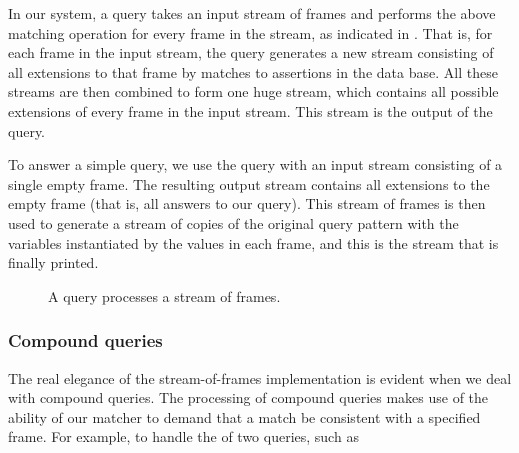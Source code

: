 In our system, a query takes an input stream of frames and performs the above
matching operation for every frame in the stream, as indicated in .
That is, for each frame in the input stream, the query generates a new
stream consisting of all extensions to that frame by matches to assertions in
the data base.  All these streams are then combined to form one huge stream,
which contains all possible extensions of every frame in the input stream.
This stream is the output of the query.

To answer a simple query, we use the query with an input stream consisting of a
single empty frame.  The resulting output stream contains all extensions to the
empty frame (that is, all answers to our query).  This stream of frames is then
used to generate a stream of copies of the original query pattern with the
variables instantiated by the values in each frame, and this is the stream that
is finally printed.

\begin{figure}[tb]
\label{Figure 4.4}
\centering
\begin{comment}
\heading{Figure 4.4:} A query processes a stream of frames.

\begin{example}
                                  output stream
  input stream   +-------------+  of frames,
  of frames      |    query    |  filtered and extended
---------------->|             +------------------------->
                 | (job ?x ?y) |
                 +-------------+
                        ^
                        |
               stream of assertions
                  from data base
\end{example}
\end{comment}

\par\bigskip
\noindent
{} A query processes a stream of frames.
\end{figure}

\subsubsection*{Compound queries}

The real elegance of the stream-of-frames implementation is evident when we
deal with compound queries.  The processing of compound queries makes use of
the ability of our matcher to demand that a match be consistent with a
specified frame.  For example, to handle the  of two queries, such as

